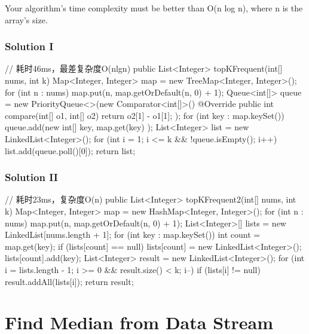 Your algorithm's time complexity must be better than O(n log n), where n is the array's size.

\subsubsection{Solution I}

\begin{Code}
// 耗时46ms，最差复杂度O(nlgn)
public List<Integer> topKFrequent(int[] nums, int k) {
    Map<Integer, Integer> map = new TreeMap<Integer, Integer>();
    for (int n : nums) {
        map.put(n, map.getOrDefault(n, 0) + 1);
    }
    Queue<int[]> queue = new PriorityQueue<>(new Comparator<int[]>() {
        @Override
        public int compare(int[] o1, int[] o2) {
            return o2[1] - o1[1];
        }
    });
    for (int key : map.keySet()) {
        queue.add(new int[] { key, map.get(key) });
    }
    List<Integer> list = new LinkedList<Integer>();
    for (int i = 1; i <= k && !queue.isEmpty(); i++) {
        list.add(queue.poll()[0]);
    }
    return list;
}
\end{Code}

\newpage

\subsubsection{Solution II}

\begin{Code}
// 耗时23ms，复杂度O(n)
public List<Integer> topKFrequent2(int[] nums, int k) {
    Map<Integer, Integer> map = new HashMap<Integer, Integer>();
    for (int n : nums) {
        map.put(n, map.getOrDefault(n, 0) + 1);
    }
    List<Integer>[] lists = new LinkedList[nums.length + 1];
    for (int key : map.keySet()) {
        int count = map.get(key);
        if (lists[count] == null) {
            lists[count] = new LinkedList<Integer>();
        }
        lists[count].add(key);
    }
    List<Integer> result = new LinkedList<Integer>();
    for (int i = lists.length - 1; i >= 0 && result.size() < k; i--) {
        if (lists[i] != null) {
            result.addAll(lists[i]);
        }
    }
    return result;
}
\end{Code}

\newpage

\section{Find Median from Data Stream} %

